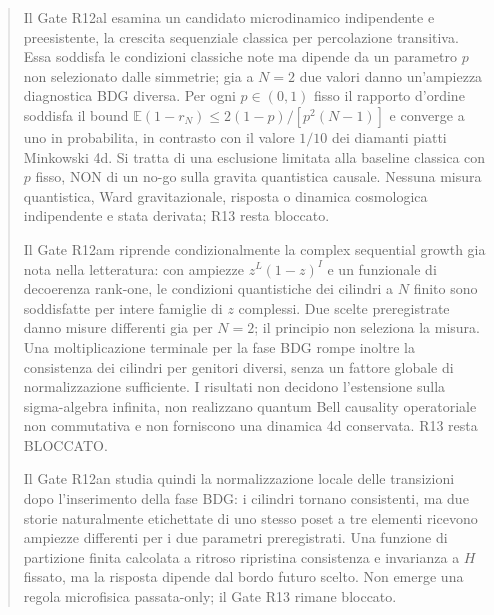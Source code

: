 \documentclass[11pt,a4paper]{article}
\begin{document}
\begin{abstract}
Il Gate R12al esamina un candidato microdinamico indipendente e preesistente, la crescita sequenziale classica per percolazione transitiva. Essa soddisfa le condizioni classiche note ma dipende da un parametro $p$ non selezionato dalle simmetrie; gia a $N=2$ due valori danno un'ampiezza diagnostica BDG diversa. Per ogni $p\in(0,1)$ fisso il rapporto d'ordine soddisfa il bound $\mathbb E(1-r_N)\le 2(1-p)/[p^2(N-1)]$ e converge a uno in probabilita, in contrasto con il valore $1/10$ dei diamanti piatti Minkowski 4d. Si tratta di una esclusione limitata alla baseline classica con $p$ fisso, NON di un no-go sulla gravita quantistica causale. Nessuna misura quantistica, Ward gravitazionale, risposta o dinamica cosmologica indipendente e stata derivata; R13 resta bloccato.


Il Gate R12am riprende condizionalmente la complex sequential growth gia nota nella letteratura: con ampiezze $z^{L}(1-z)^{I}$ e un funzionale di decoerenza rank-one, le condizioni quantistiche dei cilindri a $N$ finito sono soddisfatte per intere famiglie di $z$ complessi. Due scelte preregistrate danno misure differenti gia per $N=2$; il principio non seleziona la misura. Una moltiplicazione terminale per la fase BDG rompe inoltre la consistenza dei cilindri per genitori diversi, senza un fattore globale di normalizzazione sufficiente. I risultati non decidono l'estensione sulla sigma-algebra infinita, non realizzano quantum Bell causality operatoriale non commutativa e non forniscono una dinamica 4d conservata. R13 resta BLOCCATO.

Il Gate R12an studia quindi la normalizzazione locale delle transizioni dopo l'inserimento della fase BDG: i cilindri tornano consistenti, ma due storie naturalmente etichettate di uno stesso poset a tre elementi ricevono ampiezze differenti per i due parametri preregistrati. Una funzione di partizione finita calcolata a ritroso ripristina consistenza e invarianza a $H$ fissato, ma la risposta dipende dal bordo futuro scelto. Non emerge una regola microfisica passata-only; il Gate R13 rimane bloccato.


\end{abstract}
\end{document}
